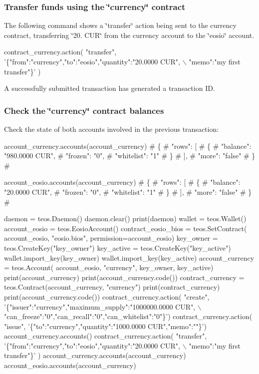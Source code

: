  \subsubsection*{Transfer funds using the \char`\"{}currency\char`\"{} contract}

The following command shows a \char`\"{}transfer\char`\"{} action being sent to the currency contract, transferring \char`\"{}20. C\+U\+R\char`\"{} from the currency account to the \char`\"{}eosio\char`\"{} account. 
\begin{DoxyCode}
contract\_currency.action(
  "transfer",
  '\{"from":"currency","to":"eosio","quantity":"20.0000 CUR", \(\backslash\)
    "memo":"my first transfer"\}'
)
\end{DoxyCode}
 A successfully submitted transaction has generated a transaction ID.

\subsubsection*{Check the \char`\"{}currency\char`\"{} contract balances}

Check the state of both accounts involved in the previous transaction\+: 
\begin{DoxyCode}
account\_currency.accounts(account\_currency)
#  \{
#      "rows": [
#          \{
#              "balance": "980.0000 CUR",
#              "frozen": "0",
#              "whitelist": "1"
#          \}
#      ],
#      "more": "false"
#  \}
#

account\_eosio.accounts(account\_currency)
#  \{
#      "rows": [
#          \{
#              "balance": "20.0000 CUR",
#              "frozen": "0",
#              "whitelist": "1"
#          \}
#      ],
#      "more": "false"
#  \}
#
\end{DoxyCode}



\begin{DoxyCode}
daemon = teos.Daemon()
daemon.clear()
print(daemon)
wallet = teos.Wallet()
account\_eosio = teos.EosioAccount()
contract\_eosio\_bios = teos.SetContract(
    account\_eosio, "eosio.bios", permission=account\_eosio)
key\_owner = teos.CreateKey("key\_owner")
key\_active = teos.CreateKey("key\_active")
wallet.import\_key(key\_owner)
wallet.import\_key(key\_active)
account\_currency = teos.Account(
    account\_eosio, "currency", key\_owner, key\_active)
print(account\_currency)
print(account\_currency.code())
contract\_currency = teos.Contract(account\_currency, "currency")
print(contract\_currency)
print(account\_currency.code())
contract\_currency.action(
  "create", 
  '\{"issuer":"currency","maximum\_supply":"1000000.0000 CUR", \(\backslash\)
  "can\_freeze":"0","can\_recall":"0","can\_whitelist":"0"\}')
contract\_currency.action(
  "issue", 
  '\{"to":"currency","quantity":"1000.0000 CUR","memo":""\}')
account\_currency.accounts()
contract\_currency.action(
  "transfer",
  '\{"from":"currency","to":"eosio","quantity":"20.0000 CUR", \(\backslash\)
    "memo":"my first transfer"\}'
)
account\_currency.accounts(account\_currency)
account\_eosio.accounts(account\_currency)
\end{DoxyCode}
 